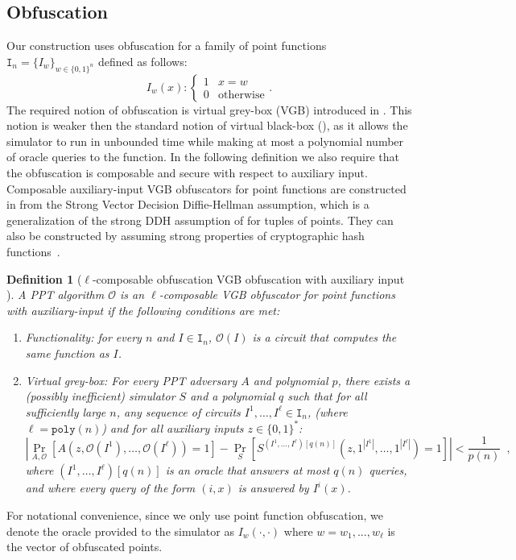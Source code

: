 \documentclass[11pt]{article}
\newcommand{\zo}{\ensuremath{\{0, 1\}}}
\newcommand{\poly}{\ensuremath{\mathtt{poly}}\xspace}
\newtheorem{definition}[theorem]{Definition}
\begin{document}
\subsection{Obfuscation}
Our construction uses obfuscation for a family of point functions $\mathtt{I}_n = \{I_w\}_{w \in \zo^n}$ defined as follows:
\[
I_w(x):\begin{cases} 1 & x=w\\0 & \text{otherwise}\end{cases}.
\]
The required notion of obfuscation is virtual grey-box (VGB) introduced in \cite{bitansky2010strong}. This notion is weaker then the standard notion of virtual black-box (\cite{barak2001possibility}), as it allows the simulator to run in unbounded time while making at most a polynomial number of oracle queries to the function. In the following definition we also require that the obfuscation is composable and secure with respect to auxiliary input. Composable auxiliary-input VGB obfuscators for point functions are constructed in \cite[Theorem 6.1]{bitansky2010strong} from the Strong Vector Decision Diffie-Hellman assumption, which is a generalization of the strong DDH assumption of \cite{canetti1997towards} for tuples of points. They can also be constructed by assuming strong properties of cryptographic hash functions~\cite{canetti1997towards}.

\begin{definition}[$\ell$-composable obfuscation VGB obfuscation with auxiliary input \cite{bitansky2010strong}]
\label{def:obf} A PPT algorithm $\mathcal{O}$ is an $\ell$-composable VGB obfuscator for point functions with auxiliary-input if the following conditions are met:
\begin{enumerate}
\item \emph{Functionality:} for every $n$ and $I \in \mathtt{I}_n$, $\mathcal{O}(I)$ is a circuit that computes the same function as $I$.
\item \emph{Virtual grey-box:}  For every PPT adversary $A$ and polynomial $p$, there exists a (possibly inefficient) simulator $S$ and a polynomial $q$ such that for all sufficiently large $n$, any  sequence of circuits $I^1,\dots,I^\ell \in \mathtt{I}_n$, (where $\ell=\poly(n)$) and for all auxiliary inputs $z\in \zo^*$:
\[
|\Pr_{A,\mathcal{O}}[A(z,\mathcal{O}(I^1),\dots,\mathcal{O}(I^\ell)) = 1] - \Pr_{S}[S^{(I^1,\dots,I^\ell)[q(n)]}(z, 1^{|I^1|},\dots,1^{|I^\ell|}) = 1] | < \frac{1}{p(n)} \enspace,
\]
where $(I^1,\dots,I^\ell)[q(n)]$ is an oracle that answers at most $q(n)$ queries, and where every query of the form $(i,x)$ is answered by $I^i(x)$.
\end{enumerate}
\end{definition}
For notational convenience, since we only use point function obfuscation, we denote the oracle provided to the simulator as $I_w(\cdot, \cdot)$ where $w = w_1,..., w_\ell$ is the vector of obfuscated points.
\end{document}

